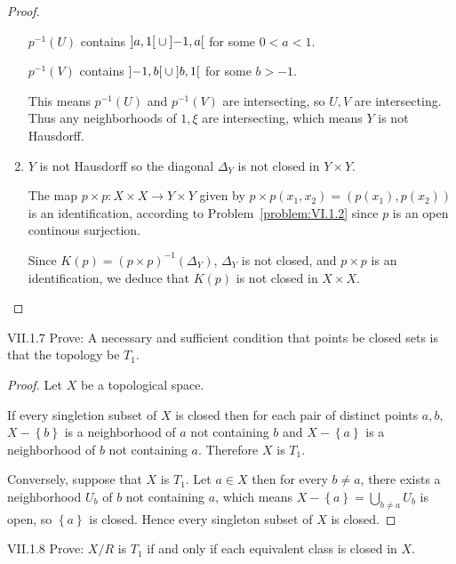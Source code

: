 \begin{proof}
\begin{enumerate}[label={(\alph*)}]
		      \( p^{-1}(U) \) contains \( \left\rbrack{a, 1}\right\lbrack \cup \left\rbrack{-1, a}\right\lbrack \) for some \( 0 < a < 1 \).

		      \( p^{-1}(V) \) contains \( \left\rbrack{-1, b}\right\lbrack \cup \left\rbrack{b, 1}\right\lbrack \) for some \( b > -1 \).

		      This means \( p^{-1}(U) \) and \( p^{-1}(V) \) are intersecting, so \( U, V \) are intersecting. Thus any neighborhoods of \( 1, \xi \) are intersecting, which means \( Y \) is not Hausdorff.
		\item \( Y \) is not Hausdorff so the diagonal \( \Delta_{Y} \) is not closed in \( Y \times Y \).

		      The map \( p \times p: X \times X \to Y \times Y \) given by \( p\times p(x_{1}, x_{2}) = (p(x_{1}), p(x_{2})) \) is an identification, according to Problem~\ref{problem:VI.1.2} since \( p \) is an open continous surjection.

		      Since \( K(p) = {(p \times p)}^{-1}(\Delta_{Y}) \), \( \Delta_{Y} \) is not closed, and \( p \times p \) is an identification, we deduce that \( K(p) \) is not closed in \( X \times X \).
	\end{enumerate}
\end{proof}

\begin{problem}{VII.1.7}\label{problem:VII.1.7}
Prove: A necessary and sufficient condition that points be closed sets is that the topology be \( T_{1} \).
\end{problem}

\begin{proof}
	Let \( X \) be a topological space.

	If every singletion subset of \( X \) is closed then for each pair of distinct points \( a, b \), \( X - \left\{ b \right\} \) is a neighborhood of \( a \) not containing \( b \) and \( X - \left\{ a \right\} \) is a neighborhood of \( b \) not containing \( a \). Therefore \( X \) is \( T_{1} \).

	Conversely, suppose that \( X \) is \( T_{1} \). Let \( a \in X \) then for every \( b \ne a \), there exists a neighborhood \( U_{b} \) of \( b \) not containing \( a \), which means \( X - \left\{ a \right\} = \bigcup_{b\ne a} U_{b} \) is open, so \( \left\{ a \right\} \) is closed. Hence every singleton subset of \( X \) is closed.
\end{proof}

\begin{problem}{VII.1.8}
Prove: \( X/R \) is \( T_{1} \) if and only if each equivalent class is closed in \( X \).
\end{problem}

